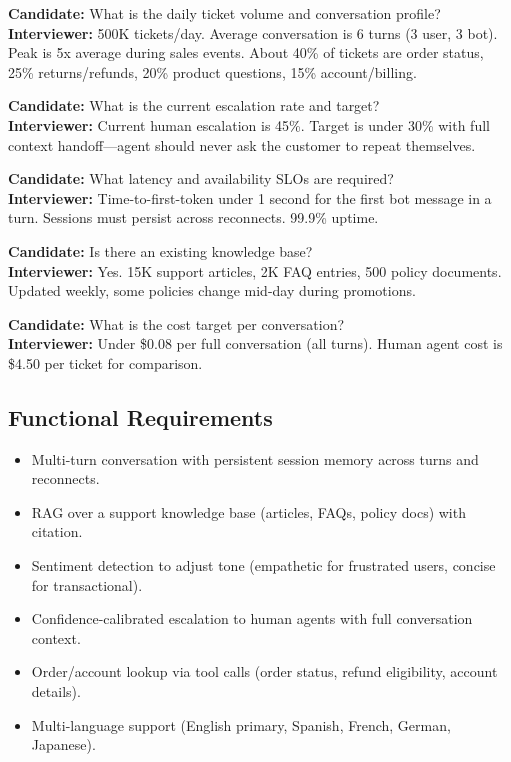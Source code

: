 \textbf{Candidate:} What is the daily ticket volume and conversation profile?\\
\textbf{Interviewer:} 500K tickets/day. Average conversation is 6 turns (3 user, 3 bot). Peak is 5x average during sales events. About 40\% of tickets are order status, 25\% returns/refunds, 20\% product questions, 15\% account/billing.

\textbf{Candidate:} What is the current escalation rate and target?\\
\textbf{Interviewer:} Current human escalation is 45\%. Target is under 30\% with full context handoff---agent should never ask the customer to repeat themselves.

\textbf{Candidate:} What latency and availability SLOs are required?\\
\textbf{Interviewer:} Time-to-first-token under 1 second for the first bot message in a turn. Sessions must persist across reconnects. 99.9\% uptime.

\textbf{Candidate:} Is there an existing knowledge base?\\
\textbf{Interviewer:} Yes. 15K support articles, 2K FAQ entries, 500 policy documents. Updated weekly, some policies change mid-day during promotions.

\textbf{Candidate:} What is the cost target per conversation?\\
\textbf{Interviewer:} Under \$0.08 per full conversation (all turns). Human agent cost is \$4.50 per ticket for comparison.

\subsection*{Functional Requirements}

\begin{itemize}
  \item Multi-turn conversation with persistent session memory across turns and reconnects.
  \item RAG over a support knowledge base (articles, FAQs, policy docs) with citation.
  \item Sentiment detection to adjust tone (empathetic for frustrated users, concise for transactional).
  \item Confidence-calibrated escalation to human agents with full conversation context.
  \item Order/account lookup via tool calls (order status, refund eligibility, account details).
  \item Multi-language support (English primary, Spanish, French, German, Japanese).
\end{itemize}


